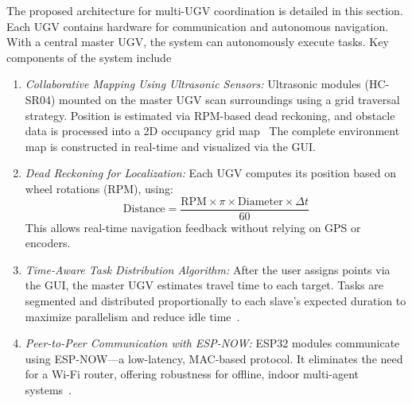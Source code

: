 \documentclass[conference]{IEEEtran}
\begin{document}
The proposed architecture for multi-UGV coordination is detailed in this section. Each UGV contains hardware for communication and autonomous navigation. With a central master UGV, the system can autonomously execute tasks. Key components of the system include
\begin{enumerate}
	\item {\em Collaborative Mapping Using Ultrasonic Sensors:}
Ultrasonic modules (HC-SR04) mounted on the master UGV scan surroundings using a grid traversal strategy. Position is estimated via RPM-based dead reckoning, and obstacle data is processed into a 2D occupancy grid map~\cite{arduino_hcsr04}
The complete environment map is constructed in real-time and visualized via the GUI.
%
\item {\em Dead Reckoning for Localization: }
Each UGV computes its position based on wheel rotations (RPM), using:
\begin{equation}
\text{Distance} = \frac{\text{RPM} \times \pi \times \text{Diameter} \times \Delta t}{60}
\end{equation}
This allows real-time navigation feedback without relying on GPS or encoders.

\item {\em Time-Aware Task Distribution Algorithm:}
After the user assigns points via the GUI, the master UGV estimates travel time to each target. Tasks are segmented and distributed proportionally to each slave’s expected duration to maximize parallelism and reduce idle time~\cite{jin2024multi}.

\item {\em Peer-to-Peer Communication with ESP-NOW:}
ESP32 modules communicate using ESP-NOW—a low-latency, MAC-based protocol. It eliminates the need for a Wi-Fi router, offering robustness for offline, indoor multi-agent systems~\cite{espnowguide}.


\end{enumerate}
\end{document}
